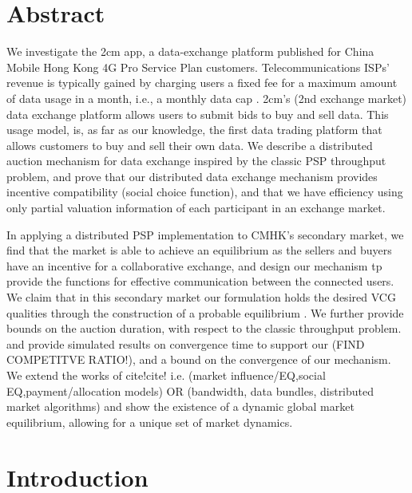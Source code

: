 \documentclass[12pt]{article}
\theoremstyle{definition}
\begin{document}
\begin{multicols}{2}

\section{Abstract}

We investigate the 2cm app, a data-exchange platform published for China Mobile Hong
Kong 4G Pro Service Plan customers. Telecommunications ISPs' revenue is typically
gained by charging users a fixed fee for a maximum amount
of data usage in a month, i.e., a monthly data cap \cite{???}. 
2cm's (2nd exchange market) data exchange platform allows users to submit
bids to buy and sell data.
This usage model, is, as far as our knowledge, the first data trading
platform that allows customers to buy and sell their own data.
We describe a distributed auction mechanism for data exchange inspired by the
classic PSP throughput problem,
and prove that our distributed data exchange mechanism provides incentive
compatibility (social choice function), and that we have efficiency
using only partial valuation information of each participant in an exchange market.

In applying a distributed PSP implementation to CMHK's secondary market, we
find that
the market is able to achieve an equilibrium as the sellers and buyers have an
incentive for a collaborative exchange, and design our mechanism tp provide the functions
for effective communication between the connected users. We claim that in
this secondary market our formulation holds the desired VCG qualities through the construction of a
probable equilibrium \cite{???}. We further provide bounds on the auction duration, 
with respect to the classic throughput problem.
and provide simulated results on convergence time to support our (FIND
COMPETITVE RATIO!), and a bound
on the convergence of our mechanism. We extend the works of cite!cite!
i.e. (market influence/EQ,social EQ,payment/allocation models) OR (bandwidth, data bundles, distributed
market algorithms) and show the existence of a dynamic global market equilibrium, allowing for a unique set of market dynamics.



\section{Introduction}


\end{multicols}
\end{document}
